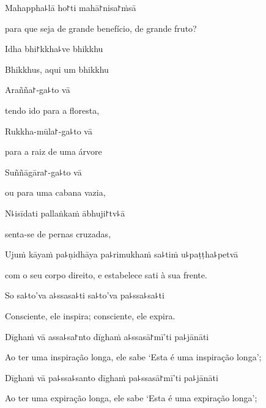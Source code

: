 Mahappha꜕lā ho꜓ti mahā꜓nisa꜓ṁsā

\begin{english}
  para que seja de grande benefício, de grande fruto?
\end{english}

Idha bhi꜓kkha꜕ve bhikkhu

\begin{english}
  Bhikkhus, aqui um bhikkhu
\end{english}

Arañña꜓-ga꜕to vā

\begin{english}
  tendo ido para a floresta,
\end{english}

Rukkha-mūla꜓-ga꜕to vā

\begin{english}
  para a raiz de uma árvore
\end{english}

Suññāgāra꜓-ga꜕to vā

\begin{english}
  ou para uma cabana vazia,
\end{english}

N꜕isīdati pallaṅkaṁ ābhuji꜓tv꜕ā

\begin{english}
  senta-se de pernas cruzadas,
\end{english}

Ujuṁ kāyaṁ pa꜕ṇidhāya pa꜕rimukhaṁ sa꜕tiṁ u꜕paṭṭha꜕petvā

\begin{english}
  com o seu corpo direito, e estabelece sati à sua frente.
\end{english}

So sa꜕to'va a꜕ssasa꜕ti sa꜕to'va pa꜕ssa꜕sa꜕ti

\begin{english}
  Consciente, ele inspira; consciente, ele expira.
\end{english}

Dīghaṁ vā assa꜕sa꜓nto dīghaṁ a꜕ssasā꜓mī'ti pa꜕jānāti

\begin{english}
  Ao ter uma inspiração longa, ele sabe `Esta é uma inspiração longa';
\end{english}

Dīghaṁ vā pa꜕ssa꜕santo dīghaṁ pa꜕ssasā꜓mī'ti pa꜕jānāti

\begin{english}
  Ao ter uma expiração longa, ele sabe `Esta é uma expiração longa';
\end{english}

